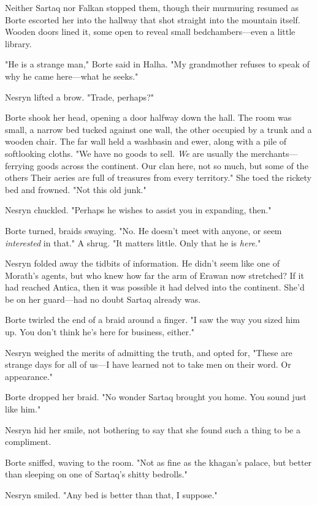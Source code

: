 Neither Sartaq nor Falkan stopped them, though their murmuring resumed as Borte escorted her into the hallway that shot straight into the mountain itself. Wooden doors lined it, some open to reveal small bedchambers---even a little library.

"He is a strange man," Borte said in Halha. "My grandmother refuses to speak of why he came here---what he seeks."

Nesryn lifted a brow. "Trade, perhaps?"

Borte shook her head, opening a door halfway down the hall. The room was small, a narrow bed tucked against one wall, the other occupied by a trunk and a wooden chair. The far wall held a washbasin and ewer, along with a pile of softlooking cloths. "We have no goods to sell. \emph{We}
are usually the merchants--- ferrying goods across the continent. Our clan here, not so much, but some of the others  Their aeries are full of treasures from every territory." She toed the rickety bed and frowned. "Not this old junk."

Nesryn chuckled. "Perhaps he wishes to assist you in expanding, then."

Borte turned, braids swaying. "No. He doesn't meet with anyone, or seem
\emph{interested} in that." A shrug. "It matters little. Only that he is \emph{here}."

Nesryn folded away the tidbits of information. He didn't seem like one of Morath's agents, but who knew how far the arm of Erawan now stretched? If it had reached Antica, then it was possible it had delved into the continent. She'd be on her guard---had no doubt Sartaq already was.

Borte twirled the end of a braid around a finger. "I saw the way you sized him up. You don't think he's here for business, either."

Nesryn weighed the merits of admitting the truth, and opted for, "These are strange days for all of us---I have learned not to take men on their word. Or appearance."

Borte dropped her braid. "No wonder Sartaq brought you home. You sound just like him."

Nesryn hid her smile, not bothering to say that she found such a thing to be a compliment.

Borte sniffed, waving to the room. "Not as fine as the khagan's palace, but better than sleeping on one of Sartaq's shitty bedrolls."

Nesryn smiled. "Any bed is better than that, I suppose."

